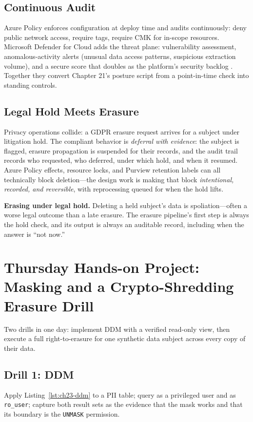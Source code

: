 \subsection{Continuous Audit}
Azure Policy enforces configuration at deploy time and audits continuously: deny public network access, require tags, require CMK for in-scope resources. Microsoft Defender for Cloud adds the threat plane: vulnerability assessment, anomalous-activity alerts (unusual data access patterns, suspicious extraction volume), and a secure score that doubles as the platform's security backlog \cite{microsoft2025defender}. Together they convert Chapter 21's posture script from a point-in-time check into standing controls.

\subsection{Legal Hold Meets Erasure}
Privacy operations collide: a GDPR erasure request arrives for a subject under litigation hold. The compliant behavior is \emph{deferral with evidence}: the subject is flagged, erasure propagation is suspended for their records, and the audit trail records who requested, who deferred, under which hold, and when it resumed. Azure Policy effects, resource locks, and Purview retention labels can all technically block deletion---the design work is making that block \emph{intentional, recorded, and reversible}, with reprocessing queued for when the hold lifts.

\begin{pitfall}
\textbf{Erasing under legal hold.} Deleting a held subject's data is spoliation---often a worse legal outcome than a late erasure. The erasure pipeline's first step is always the hold check, and its output is always an auditable record, including when the answer is ``not now.''
\end{pitfall}

\section{Thursday Hands-on Project: Masking and a Crypto-Shredding Erasure Drill}
Two drills in one day: implement DDM with a verified read-only view, then execute a full right-to-erasure for one synthetic data subject across every copy of their data.

\subsection{Drill 1: DDM}
Apply Listing~\ref{lst:ch23-ddm} to a PII table; query as a privileged user and as \texttt{ro\_user}; capture both result sets as the evidence that the mask works and that its boundary is the \texttt{UNMASK} permission.

